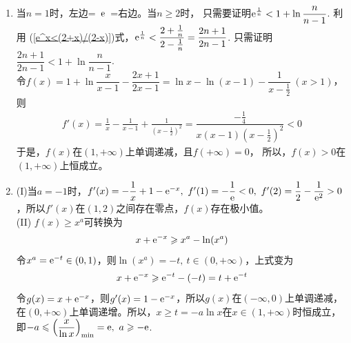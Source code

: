 \begin{enumerate}[label={\textbf{\arabic*.}},leftmargin=
    \inteval{\myenumleftmargin}pt]
\item  当$ n=1 $时，左边=\ $ \mathrm{e} $\ =右边。当$ n\geq 2 $时，
只需要证明$ \mathrm{e}^{\frac{1}{n}}<1+\ln \dfrac{n}{n-1} $. 利用
(\ref{e^x<(2+x)/(2-x)})式，$ \mathrm{e}^{\frac{1}{n}}<\dfrac{2+
    \frac{1}{n}}{2-\frac{1}{n}}=\dfrac{2n+1}{2n-1} $.
只需证明$ \dfrac{2n+1}{2n-1}<1+\ln \dfrac{n}{n-1} $. \\
令$ f(x)=1+\ln \dfrac{x}{x-1}-\dfrac{2x+1}{2x-1}=
\ln x-\ln(x-1)-\dfrac{1}{x-\frac{1}{2}}\ (x>1) $，则
\begin{align*}
    f'(x)=\frac{1}{x}-\frac{1}{x-1}+\frac{1}{(x-\frac{1}{2})^2}
    =\dfrac{-\frac{1}{4}}{x(x-1)(x-\frac{1}{2})^2}<0
\end{align*}
于是，$ f(x) $在$ (1,+\infty) $上单调递减，且$ f(+\infty)=0 $，
所以，$ f(x)>0 $在$ (1,+\infty) $上恒成立。

\item (I)当$ a=-1 $时，$ f'(x)=-\dfrac{1}{x}+1-\e^{-x},\ f'(1)=-\dfrac{1}{\e}<0,\ f'(2)=\dfrac{1}{2}-\dfrac{1}{\e^2}>0 $，所以$ f'(x) $在$ (1,2) $之间存在零点，$ f(x) $存在极小值。\\
(II) $ f(x)\geq x^a $可转换为
\begin{gather*}
    x+\mathrm{e}^{-x} \geqslant x^a -\ln (x^a) 	
\end{gather*}
令$ x^a=\mathrm{e}^{-t}\in (0,1) $，则$ \ln (x^a) =-t,\ t\in(0,+\infty) $，上式变为
\begin{gather*}
    x+\mathrm{e}^{-x} \geqslant \mathrm{e}^{-t}-(-t)=t+\mathrm{e}^{-t} 
\end{gather*}
令$ g(x)=x+\mathrm{e}^{-x} $，则$ g'(x)=1-\mathrm{e}^{-x} $，所以$ g(x) $在$ (-\infty,0) $上单调递减，在$ (0,+\infty) $上单调递增。所以，$ x\geq t =-a\ln x $在$ x\in(1,+\infty) $时恒成立，即$ -a\leq \left(\dfrac{x}{\ln x}\right)_{\min}=\e,\ a\geq -\e $. 


\end{enumerate}
